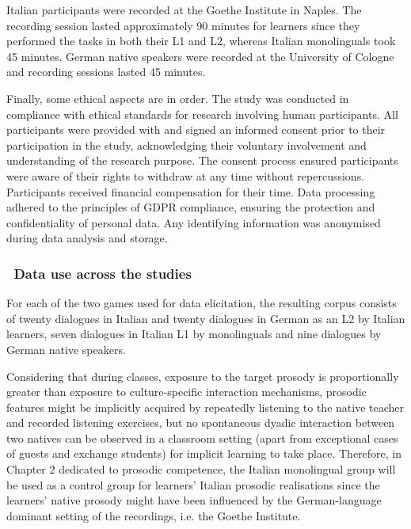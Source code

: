 \begin{styleStandard}
Italian participants were recorded at the Goethe Institute in Naples. The recording session lasted approximately 90 minutes for learners since they performed the tasks in both their L1 and L2, whereas Italian monolinguals took 45 minutes. German native speakers were recorded at the University of Cologne and recording sessions lasted 45 minutes.
\end{styleStandard}

\begin{styleStandard}
Finally, some ethical aspects are in order. The study was conducted in compliance with ethical standards for research involving human participants. All participants were provided with and signed an informed consent prior to their participation in the study, acknowledging their voluntary involvement and understanding of the research purpose. The consent process ensured participants were aware of their rights to withdraw at any time without repercussions. Participants received financial compensation for their time. Data processing adhered to the principles of GDPR compliance, ensuring the protection and confidentiality of personal data. Any identifying information was anonymised during data analysis and storage.\newline

\end{styleStandard}

\subsubsection[\ Data use across the studies]{\ Data use across the studies}
\hypertarget{Toc191305881}{}\begin{styleStandard}
For each of the two games used for data elicitation, the resulting corpus consists of twenty dialogues in Italian and twenty dialogues in German as an L2 by Italian learners, seven dialogues in Italian L1 by monolinguals and nine dialogues by German native speakers.
\end{styleStandard}

\begin{styleStandard}
Considering that during classes, exposure to the target prosody is proportionally greater than exposure to culture-specific interaction mechanisms, prosodic features might be implicitly acquired by repeatedly listening to the native teacher and recorded listening exercises, but no spontaneous dyadic interaction between two natives can be observed in a classroom setting (apart from exceptional cases of guests and exchange students) for implicit learning to take place. Therefore, in Chapter 2 dedicated to prosodic competence, the Italian monolingual group will be used as a control group for learners’ Italian prosodic realisations since the learners’ native prosody might have been influenced by the German-language dominant setting of the recordings, i.e. the Goethe Institute. 
\end{styleStandard}


